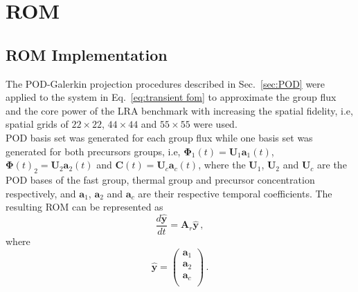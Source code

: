 \documentclass[]{interact}
\theoremstyle{plain}%
\theoremstyle{definition}
\theoremstyle{remark}
\begin{document}

\section{ROM }
\subsection{ROM Implementation}

The POD-Galerkin projection procedures described in Sec.~\ref{sec:POD} were applied to the system in Eq.~\ref{eq:transient fom} to approximate the group flux and the core power of the LRA benchmark with increasing the spatial fidelity, i.e, spatial grids of $22\times 22$, $44\times44$ and $55 \times 55$ were used.\\
POD basis set was generated for each group flux while one basis set was generated for both precursors groups, i.e, 
$\mathbf{\Phi}_1(t) = \mathbf{U}_1\mathbf{a}_1(t)$, $\mathbf{\Phi}(t)_2 = \mathbf{U}_2\mathbf{a}_2(t)$ and $\mathbf{C}(t) = \mathbf{U}_c\mathbf{a}_c(t)$, where the $\mathbf{U}_1$, $\mathbf{U}_2$  and $\mathbf{U}_c$ are the POD bases of the fast group, thermal group and precursor concentration respectively, and $\mathbf{a}_1$, $\mathbf{a}_2$ and $\mathbf{a}_c$ are their respective temporal coefficients. 
The resulting ROM can be represented as 
\begin{equation}
	\frac{d\mathbf{\hat{y}}}{dt} = \mathbf{A}_r\mathbf{\hat{y}}\, , 
	\label{eq:ROM}
\end{equation}
where
 \begin{equation*}
	\mathbf{\hat{y}} = \begin{pmatrix}
	\mathbf{a}_1\\
	\mathbf{a}_2 \\
	\mathbf{a}_c \\
	\end{pmatrix} \,.
 \end{equation*}
\end{document}
